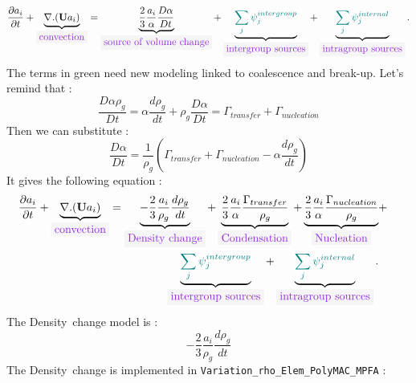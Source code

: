 \begin{equation}
\frac{\partial a_{i}}{\partial t}+\underbrace{\nabla.(\mathbf{U} a_{i})}_{\colorbox{codebackground}{\color{codekeyword3} convection}}=\underbrace{\frac{2}{3}\frac{a_{i}}{\alpha}\frac{D\alpha}{Dt}}_{\colorbox{codebackground}{\color{codekeyword3} source\ of\ volume\ change}}+\underbrace{\color{myteal}\sum_j \psi^{intergroup}_{j}}_{\colorbox{codebackground}{\color{codekeyword3} intergroup\ sources}}+\underbrace{\color{myteal}\sum_j \psi^{internal}_{j}}_{\colorbox{codebackground}{\color{codekeyword3} intragroup sources}}.
\end{equation}
The terms in green need new modeling linked to coalescence and break-up.
Let's remind that :
\begin{equation}
 \frac{D\alpha\rho_g}{Dt}=\alpha\frac{d\rho_g}{dt}+\rho_g\frac{D\alpha}{Dt}=\Gamma_{transfer}+\Gamma_{nucleation}
 \end{equation}
Then we can substitute :
\begin{equation}
 \frac{D\alpha}{Dt}=\frac{1}{\rho_g}(\Gamma_{transfer}+\Gamma_{nucleation}-\alpha\frac{d\rho_g}{dt})
 \end{equation}
It gives the following equation :
\begin{equation}
\begin{aligned}
\frac{\partial a_{i}}{\partial t}+\underbrace{\nabla.(\mathbf{U} a_{i})}_{\colorbox{codebackground}{\color{codekeyword3} convection}}=\underbrace{-\frac{2}{3}\frac{a_{i}}{\rho_g}\frac{d\rho_g}{dt}}_{\colorbox{codebackground}{\color{codekeyword3} Density\ change}}+\underbrace{\frac{2}{3}\frac{a_{i}}{\alpha}\frac{\Gamma_{transfer}}{\rho_g}}_{\colorbox{codebackground}{\color{codekeyword3} Condensation}}+\underbrace{\frac{2}{3}\frac{a_{i}}{\alpha}\frac{\Gamma_{nucleation}}{\rho_g}}_{\colorbox{codebackground}{\color{codekeyword3} Nucleation}}&+ & \\\underbrace{\color{myteal} \sum_j \psi^{intergroup}_{j}}_{\colorbox{codebackground}{\color{codekeyword3} intergroup\ sources}}+\underbrace{\color{myteal} \sum_j \psi^{internal}_{j}}_{\colorbox{codebackground}{\color{codekeyword3} intragroup sources}}.
\end{aligned}
\end{equation}
The {\colorbox{codebackground}{\color{codekeyword3} Density\ change}} model is :
\begin{equation}
    -\frac{2}{3}\frac{a_{i}}{\rho_g}\frac{d\rho_g}{dt}
\end{equation}
The {\colorbox{codebackground}{\color{codekeyword3} Density\ change}} is implemented in \texttt{Variation_rho_Elem_PolyMAC_MPFA} :
